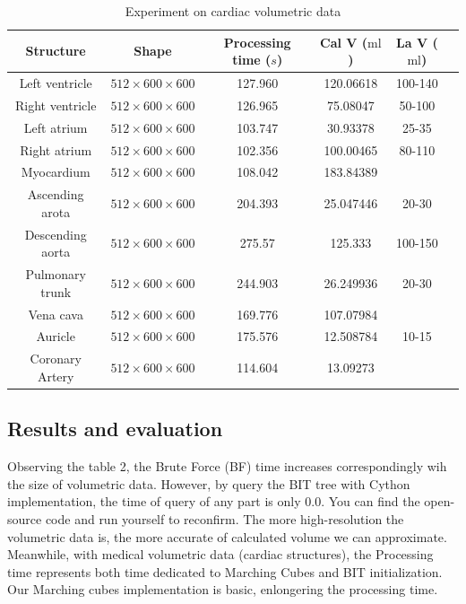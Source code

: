 \documentclass[11pt]{article}
\begin{document}
\begin{multicols}{2}
\begin{table}[]
\begin{tabular}{c|c|c|c|c|c}
    \midrule
    \textbf{Structure} & \textbf{Shape} & \textbf{Processing time ($s$)} & \textbf{Cal V ($\text{ml}$)} & \textbf{La V ($\text{ml}$)} \\ 
    \midrule
    Left ventricle & $512 \times 600 \times 600$ & 127.960 & 120.06618 & 100-140 \\
    Right ventricle & $512 \times 600 \times 600$ & 126.965 & 75.08047 & 50-100 \\
    Left atrium & $512 \times 600 \times 600$ & 103.747 & 30.93378  & 25-35 \\
    Right atrium & $512 \times 600 \times 600$ & 102.356 & 100.00465 & 80-110 \\
    Myocardium & $512 \times 600 \times 600$ &108.042 & 183.84389 & \\
    Ascending arota & $512 \times 600 \times 600$ & 204.393 & 25.047446 & 20-30  \\
    Descending aorta & $512 \times 600 \times 600$ & 275.57 & 125.333 & 100-150 \\
    Pulmonary trunk & $512 \times 600 \times 600$ & 244.903 & 26.249936 & 20-30  \\
    Vena cava & $512 \times 600 \times 600$ & 169.776 & 107.07984  & \\
    Auricle & $512 \times 600 \times 600$ & 175.576 & 12.508784 & 10-15 \\
    Coronary Artery & $512 \times 600 \times 600$ & 114.604 & 13.09273  & \\

    \end{tabular}
    \caption{Experiment on cardiac volumetric data}
    \label{tab:Experiment cardiac display}
\end{table}


\subsection{Results and evaluation}
Observing the table 2, the Brute Force (BF) time increases correspondingly wih the size of volumetric data. However, by query the BIT tree with Cython implementation, the time of query of any part is only $0.0$. You can find the open-source code and run yourself to reconfirm. The more high-resolution the volumetric data is, the more accurate of calculated volume we can approximate. Meanwhile, with medical volumetric data (cardiac structures), the Processing time represents both time dedicated to Marching Cubes and BIT initialization. Our Marching cubes implementation is basic, enlongering the processing time.  
 

\end{multicols}
\end{document}
